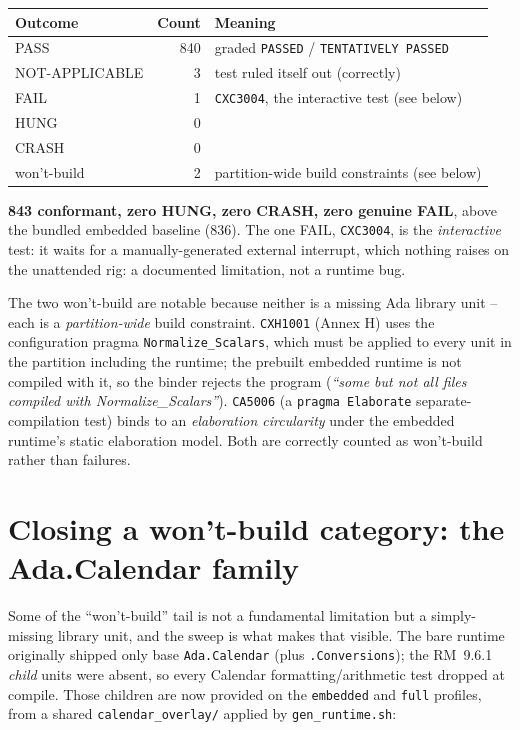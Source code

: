 \begin{longtable}{p{4.5cm} r p{6.5cm}}
\toprule
\textbf{Outcome} & \textbf{Count} & \textbf{Meaning} \\ \midrule
\endhead
PASS                & 840 & graded \texttt{PASSED} / \texttt{TENTATIVELY PASSED} \\
NOT-APPLICABLE      & 3   & test ruled itself out (correctly) \\
FAIL                & 1   & \texttt{CXC3004}, the interactive test (see below) \\
HUNG                & 0   & \\
CRASH               & 0   & \\
won't-build         & 2   & partition-wide build constraints (see below) \\
\bottomrule
\end{longtable}

\textbf{843 conformant, zero HUNG, zero CRASH, zero genuine FAIL}, above the bundled
embedded baseline (836). The one FAIL, \texttt{CXC3004}, is the \emph{interactive} test:
it waits for a manually-generated external interrupt, which nothing raises on the
unattended rig: a documented limitation, not a runtime bug.

The two won't-build are notable because neither is a missing Ada library unit --
each is a \emph{partition-wide} build constraint. \texttt{CXH1001} (Annex H) uses the
configuration pragma \texttt{Normalize\_Scalars}, which must be applied to every unit in
the partition including the runtime; the prebuilt embedded runtime is not compiled with it,
so the binder rejects the program (\emph{``some but not all files compiled with
Normalize\_Scalars''}). \texttt{CA5006} (a \texttt{pragma Elaborate} separate-compilation
test) binds to an \emph{elaboration circularity} under the embedded runtime's static
elaboration model. Both are correctly counted as won't-build rather than failures.

\section{Closing a won't-build category: the Ada.Calendar family}

Some of the ``won't-build'' tail is not a fundamental limitation but a simply-missing library
unit, and the sweep is what makes that visible. The bare runtime originally shipped only base
\texttt{Ada.Calendar} (plus \texttt{.Conversions}); the RM~9.6.1 \emph{child} units were
absent, so every Calendar formatting/arithmetic test dropped at compile. Those children are now
provided on the \texttt{embedded} and \texttt{full} profiles, from a shared
\texttt{calendar\_overlay/} applied by \texttt{gen\_runtime.sh}:

